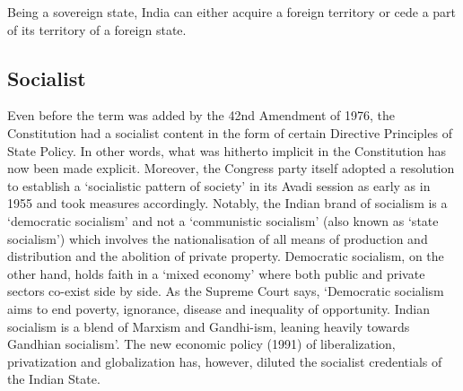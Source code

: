 Being a sovereign state, India can either acquire a foreign territory or cede a part of its territory of a foreign state.

\subsection{Socialist}

Even before the term was added by the 42nd Amendment of 1976, the Constitution had a socialist content in the form of certain Directive Principles of State Policy. In other words, what was hitherto implicit in the Constitution has now been made explicit. Moreover, the Congress party itself adopted a resolution to establish a `socialistic pattern of society' in its Avadi session as early as in 1955 and took measures accordingly. Notably, the Indian brand of socialism is a `democratic socialism' and not a `communistic socialism' (also known as `state socialism') which involves the nationalisation of all means of production and distribution and the abolition of private property. Democratic socialism, on the other hand, holds faith in a `mixed economy' where both public and private sectors co-exist side by side. As the Supreme Court says, `Democratic socialism aims to end poverty, ignorance, disease and inequality of opportunity. Indian socialism is a blend of Marxism and Gandhi-ism, leaning heavily towards Gandhian socialism'. The new economic policy (1991) of liberalization, privatization and globalization has, however, diluted the socialist credentials of the Indian State.


\printendnotes\cleardoublepage
%



